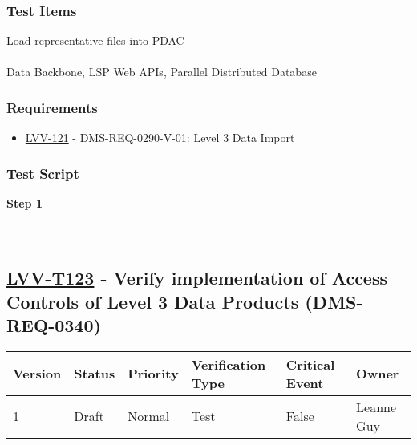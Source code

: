 \hypertarget{test-items-22}{%
\subsubsection{Test Items}\label{test-items-22}}

Load representative files into PDAC\\
~\\
Data Backbone, LSP Web APIs, Parallel Distributed Database

\hypertarget{requirements-22}{%
\subsubsection{Requirements}\label{requirements-22}}

\begin{itemize}
\tightlist
\item
  \href{https://jira.lsstcorp.org/browse/LVV-121}{LVV-121} -
  DMS-REQ-0290-V-01: Level 3 Data Import
\end{itemize}

\hypertarget{test-script-22}{%
\subsubsection{Test Script}\label{test-script-22}}

\textbf{Step 1}\\
~\\
~\\

\hypertarget{lvv-t123---verify-implementation-of-access-controls-of-level-3-data-products-dms-req-0340}{%
\subsection{\texorpdfstring{\href{https://jira.lsstcorp.org/secure/Tests.jspa\#/testCase/LVV-T123}{LVV-T123}
- Verify implementation of Access Controls of Level 3 Data Products
(DMS-REQ-0340)}{LVV-T123 - Verify implementation of Access Controls of Level 3 Data Products (DMS-REQ-0340)}}\label{lvv-t123---verify-implementation-of-access-controls-of-level-3-data-products-dms-req-0340}}

\begin{longtable}[]{@{}llllll@{}}
\toprule
Version & Status & Priority & Verification Type & Critical Event &
Owner\tabularnewline
\midrule
\endhead
1 & Draft & Normal & Test & False & Leanne Guy\tabularnewline
\bottomrule
\end{longtable}

